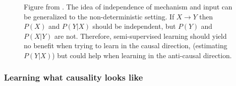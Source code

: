 \documentclass[b0,landscape,25pt]{sciposter}
\begin{document}
\begin{multicols}{5}
\begin{figure}
{}
\end{figure}

\begin{figure}
\centering
\caption{Figure from {\cite{Scholkopf2012}}. The idea of independence of mechanism and input can be generalized to the non-deterministic setting. If $X \rightarrow Y$ then $P(X)$ and $P(Y|X)$ should be independent, but $P(Y)$ and $P(X|Y)$ are not. Therefore, semi-supervised learning should yield no benefit when trying to learn in the causal direction, (estimating $P(Y|X)$) but could help when learning in the anti-causal direction.}
{}
\end{figure}

\subsubsection*{Learning what causality looks like {\cite{LopezPaz2014}}}


\end{multicols}
\end{document}
